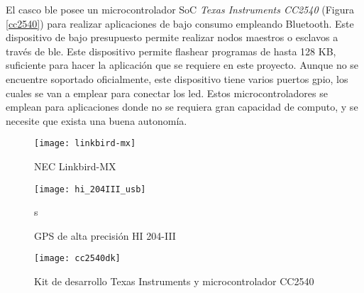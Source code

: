 El casco \gls{ble} posee un microcontrolador \gls{SoC} \emph{Texas Instruments
CC2540} (Figura \ref{cc2540}) para realizar aplicaciones de bajo consumo
empleando Bluetooth. Este dispositivo de bajo presupuesto permite realizar
nodos maestros o esclavos a través de \gls{ble}. Este dispositivo permite
flashear programas de hasta 128 KB, suficiente para hacer la aplicación que se
requiere en este proyecto. Aunque no se encuentre soportado oficialmente, este
dispositivo tiene varios puertos \gls{gpio}, los cuales se van a emplear para
conectar los led. Estos microcontroladores se emplean para aplicaciones donde
no se requiera gran capacidad de computo, y se necesite que exista una buena
autonomía.

\begin{figure}[h]
	\begin{center}
		\texttt{[image: linkbird-mx]}
		\caption{NEC Linkbird-MX}
		\label{fig:linkbird-mx}
	\end{center}
\end{figure}

\begin{figure}[h]
	\begin{center}
		\texttt{[image: hi\_204III\_usb]}
		\caption{GPS de alta precisión HI 204-III}
		\label{fig:cc2540}
	\end{center}s
\end{figure}

\begin{figure}[h]
	\begin{center}
		\texttt{[image: cc2540dk]}
		\caption{Kit de desarrollo Texas Instruments y microcontrolador CC2540}
		\label{fig:cc2540}
	\end{center}
\end{figure}
